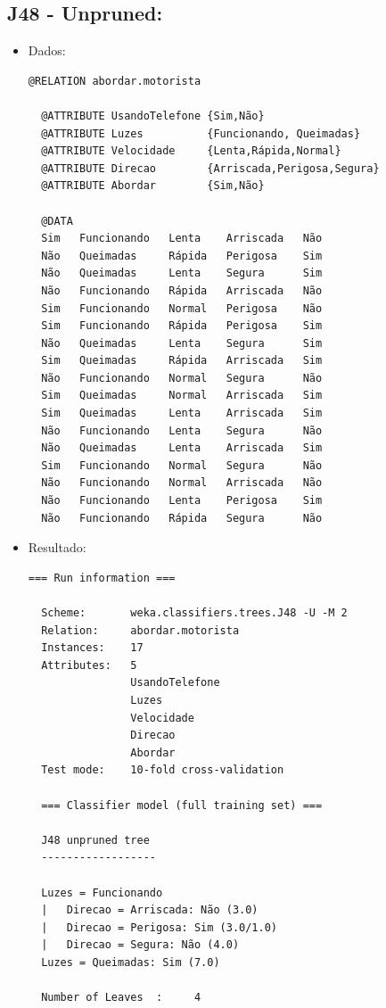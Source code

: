 \documentclass[
    article,            %
    11pt,               %
    oneside,            %
    a4paper,            %
    english,            %
    brazil,             %
    sumario=tradicional,
    ]{abntex2}
\begin{document}
\subsection{\textbf{J48 - Unpruned:}}
\begin{itemize}
  \item Dados:
  \begin{Verbatim}[frame=single, fontsize=\tiny]
  @RELATION abordar.motorista

  @ATTRIBUTE UsandoTelefone {Sim,Não}
  @ATTRIBUTE Luzes          {Funcionando, Queimadas}
  @ATTRIBUTE Velocidade     {Lenta,Rápida,Normal}
  @ATTRIBUTE Direcao        {Arriscada,Perigosa,Segura}
  @ATTRIBUTE Abordar        {Sim,Não}

  @DATA
  Sim   Funcionando   Lenta    Arriscada   Não
  Não   Queimadas     Rápida   Perigosa    Sim
  Não   Queimadas     Lenta    Segura      Sim
  Não   Funcionando   Rápida   Arriscada   Não
  Sim   Funcionando   Normal   Perigosa    Não
  Sim   Funcionando   Rápida   Perigosa    Sim
  Não   Queimadas     Lenta    Segura      Sim
  Sim   Queimadas     Rápida   Arriscada   Sim
  Não   Funcionando   Normal   Segura      Não
  Sim   Queimadas     Normal   Arriscada   Sim
  Sim   Queimadas     Lenta    Arriscada   Sim
  Não   Funcionando   Lenta    Segura      Não
  Não   Queimadas     Lenta    Arriscada   Sim
  Sim   Funcionando   Normal   Segura      Não
  Não   Funcionando   Normal   Arriscada   Não
  Não   Funcionando   Lenta    Perigosa    Sim
  Não   Funcionando   Rápida   Segura      Não
  \end{Verbatim}  
  
  \item Resultado: 
  \begin{Verbatim}[frame=single, fontsize=\tiny]
  === Run information ===

  Scheme:       weka.classifiers.trees.J48 -U -M 2
  Relation:     abordar.motorista
  Instances:    17
  Attributes:   5
                UsandoTelefone
                Luzes
                Velocidade
                Direcao
                Abordar
  Test mode:    10-fold cross-validation

  === Classifier model (full training set) ===

  J48 unpruned tree
  ------------------

  Luzes = Funcionando
  |   Direcao = Arriscada: Não (3.0)
  |   Direcao = Perigosa: Sim (3.0/1.0)
  |   Direcao = Segura: Não (4.0)
  Luzes = Queimadas: Sim (7.0)

  Number of Leaves  :     4


\end{Verbatim}
\end{itemize}
\end{document}

